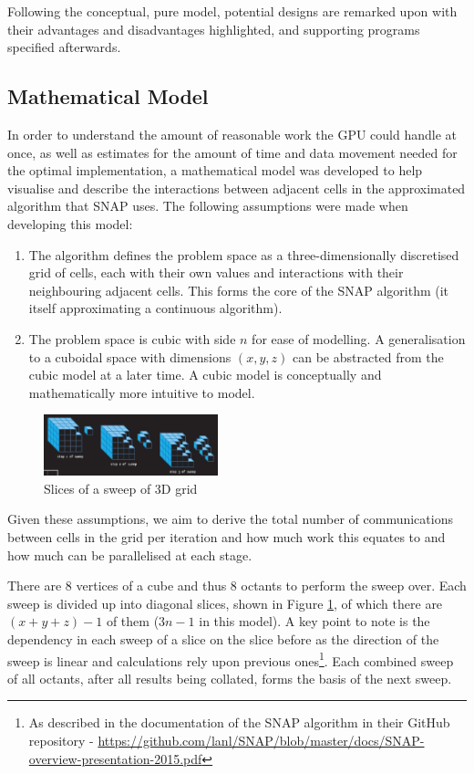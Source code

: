 \documentclass[conference]{IEEEtran}
\begin{document}
Following the conceptual, pure model, potential designs are remarked upon with their advantages and disadvantages highlighted, and supporting programs specified afterwards.


\subsection{Mathematical Model}

In order to understand the amount of reasonable work the GPU could handle at once, as well as estimates for the amount of time and data movement needed for the optimal implementation, a mathematical model was developed to help visualise and describe the interactions between adjacent cells in the approximated algorithm that SNAP uses. The following assumptions were made when developing this model:

\begin{enumerate}

\item The algorithm defines the problem space as a three-dimensionally discretised grid of cells, each with their own values and interactions with their neighbouring adjacent cells. This forms the core of the SNAP algorithm (it itself approximating a continuous algorithm).

\item The problem space is cubic with side $ n $ for ease of modelling. A generalisation to a cuboidal space with dimensions $ (x, y, z) $ can be abstracted from the cubic model at a later time. A cubic model is conceptually and mathematically more intuitive to model.

\end{enumerate}

\begin{figure}[h!]
\centering
\includegraphics[width=0.45\textwidth]{images/Sweep.jpg}
\caption{Slices of a sweep of 3D grid}
\label{fig:3dsweepslice}
\end{figure}

Given these assumptions, we aim to derive the total number of communications between cells in the grid per iteration and how much work this equates to and how much can be parallelised at each stage.

There are $ 8 $ vertices of a cube and thus $ 8 $ octants to perform the sweep over. Each sweep is divided up into diagonal slices, shown in Figure \ref{fig:3dsweepslice}, of which there are $ (x + y + z) - 1 $ of them ($ 3n - 1 $ in this model). A key point to note is the dependency in each sweep of a slice on the slice before as the direction of the sweep is linear and calculations rely upon previous ones\footnote{As described in the documentation of the SNAP algorithm in their GitHub repository - \url{ https://github.com/lanl/SNAP/blob/master/docs/SNAP-overview-presentation-2015.pdf}}. Each combined sweep of all octants, after all results being collated, forms the basis of the next sweep.
\end{document}
